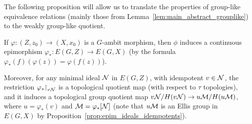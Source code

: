 	The following proposition will allow us to translate the properties of group-like equivalence relations (mainly those from Lemma~\ref{lem:main_abstract_grouplike}) to the weakly group-like quotient.
	\begin{prop}
		\label{prop:induced_epimorphism}
		If $\varphi\colon (Z,z_0)\to (X,x_0)$ is a $G$-ambit morphism, then $\phi$ induces a continuous epimorphism $\varphi_*\colon E(G,Z)\to E(G,X)$ (by the formula $\varphi_*(f)(\varphi(z))=\varphi(f(z))$).
		
		Moreover, for any minimal ideal ${\mathcal N}$ in $E(G,Z)$, with idempotent $v\in {\mathcal N}$, the restriction $\varphi_*\mathord{\upharpoonright}_{v{\mathcal N}}$ is a topological quotient map (with respect to $\tau$ topologies), and it induces a topological group quotient map $v{\mathcal N}/H(v{\mathcal N})\to u{\mathcal M}/H(u{\mathcal M})$, where $u=\varphi_*(v)$ and ${\mathcal M}=\varphi_*[{\mathcal N}]$ (note that $u{\mathcal M}$ is an Ellis group in $E(G,X)$ by Proposition~\ref{prop:epim_ideals_idempotents}).
	\end{prop}
